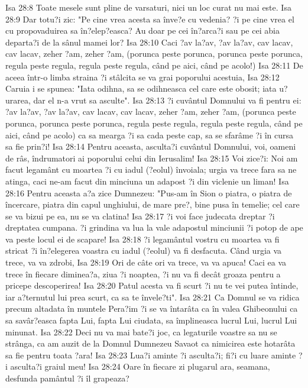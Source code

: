 Isa 28:8  Toate mesele sunt pline de varsaturi, nici un loc curat nu mai este.
Isa 28:9  Dar totu?i zic: "Pe cine vrea acesta sa înve?e cu vedenia? ?i pe cine vrea el cu propovaduirea sa în?elep?easca? Au doar pe cei în?arca?i sau pe cei abia departa?i de la sânul mamei lor?
Isa 28:10  Caci ?av la?av, ?av la?av, cav lacav, cav lacav, zeher ?am, zeher ?am, (porunca peste porunca, porunca peste porunca, regula peste regula, regula peste regula, când pe aici, când pe acolo!)
Isa 28:11  De aceea într-o limba straina ?i stâlcita se va grai poporului acestuia,
Isa 28:12  Caruia i se spunea: "Iata odihna, sa se odihneasca cel care este obosit; iata u?urarea, dar el n-a vrut sa asculte".
Isa 28:13  ?i cuvântul Domnului va fi pentru ei: ?av la?av, ?av la?av, cav lacav, cav lacav, zeher ?am, zeher ?am, (porunca peste porunca, porunca peste porunca, regula peste regula, regula peste regula, când pe aici, când pe acolo) ca sa mearga ?i sa cada peste cap, sa se sfarâme ?i în cursa sa fie prin?i!
Isa 28:14  Pentru aceasta, asculta?i cuvântul Domnului, voi, oameni de râs, îndrumatori ai poporului celui din Ierusalim!
Isa 28:15  Voi zice?i: Noi am facut legamânt cu moartea ?i cu iadul (?eolul) învoiala; urgia va trece fara sa ne atinga, caci ne-am facut din minciuna un adapost ?i din viclenie un liman!
Isa 28:16  Pentru aceasta a?a zice Dumnezeu: "Pus-am în Sion o piatra, o piatra de încercare, piatra din capul unghiului, de mare pre?, bine pusa în temelie; cel care se va bizui pe ea, nu se va clatina!
Isa 28:17  ?i voi face judecata dreptar ?i dreptatea cumpana. ?i grindina va lua la vale adapostul minciunii ?i potop de ape va peste locul ei de scapare!
Isa 28:18  ?i legamântul vostru cu moartea va fi stricat ?i în?elegerea voastra cu iadul (?eolul) va fi desfacuta. Când urgia va trece, va va zdrobi,
Isa 28:19  Ori de câte ori va trece, va va apuca! Caci ea va trece în fiecare diminea?a, ziua ?i noaptea, ?i nu va fi decât groaza pentru a pricepe descoperirea!
Isa 28:20  Patul acesta va fi scurt ?i nu te vei putea întinde, iar a?ternutul lui prea scurt, ca sa te învele?ti".
Isa 28:21  Ca Domnul se va ridica precum altadata în muntele Pera?im ?i se va întarâta ca în valea Ghibeonului ca sa savâr?easca fapta Lui, fapta Lui ciudata, sa împlineasca lucrul Lui, lucrul Lui minunat.
Isa 28:22  Deci nu va mai bate?i joc, ca legaturile voastre sa nu se strânga, ca am auzit de la Domnul Dumnezeu Savaot ca nimicirea este hotarâta sa fie pentru toata ?ara!
Isa 28:23  Lua?i aminte ?i asculta?i; fi?i cu luare aminte ?i asculta?i graiul meu!
Isa 28:24  Oare în fiecare zi plugarul ara, seamana, desfunda pamântul ?i îl grapeaza?
